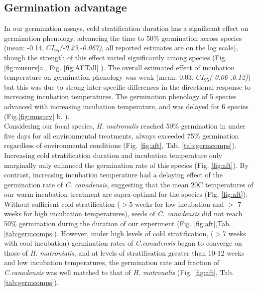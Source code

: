\documentclass{article}\usepackage[]{graphicx}\usepackage[]{color}
\begin{document}
{\subsection*{Germination advantage}
In our germination assays, cold stratification duration has a significant effect on germination phenology, advancing the time to 50\% germination across species (mean: -0.14, $CI_{95}$\textit{(-0.23,-0.067)}, all reported estimates are on the log scale), though the strength of this effect varied significantly among species  (Fig. \ref{fig:musurv}a., Fig. \ref{fig:AFTall} ). The overall estimated effect of incubation temperature on germination phenology was weak (mean: 0.03, $CI_{95}$\textit{(-0.06 ,0.12)}) but this was due to strong inter-specific differences in the directional response to increasing incubation temperatures. The germination phenology of 5 species advanced with increasing incubation temperature, and was delayed for 6 species (Fig.\ref{fig:musurv} b. ).\\%

Considering our focal species, \textit{H. matronalis} reached 50\% germination in under five days for all environmental treatments, always exceeded 75\% germination regardless of environmental conditions (Fig. \ref{fig:aft}, Tab. {\ref{tab:germcomps}}). Increasing cold stratification duration and incubation temperature only marginally only enhanced the germination rate of this species (Fig. \ref{fig:aft}). By contrast, increasing incubation temperature had a delaying effect of the germination rate of \textit{C. canadensis}, suggesting that the mean 20\degree C temperatures of our warm incubation treatment are supra-optimal for the species (Fig. \ref{fig:aft}). Without sufficient cold stratification ($>$5 weeks for low incubation and $>$ 7 weeks for high incubation temperatures), seeds of  \textit{C. canadensis} did not reach 50\% germination during the duration of our experiment (Fig. \ref{fig:aft},Tab. \ref{tab:germcomps}). However, under high levels of cold stratification, ($>$7 weeks with cool incubation) germination rates of \textit{C.canadensis} began to converge on those of \textit{H. matronialis}, and at levels of stratification greater than 10-12 weeks and low incubation temperatures, the germination rate and fraction of \textit{C.canadensis} was well matched to that of \textit{H. matronalis} (Fig. \ref{fig:aft}, Tab. \ref{tab:germcomps}).

}
\end{document}
